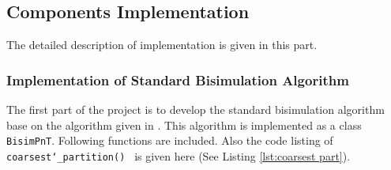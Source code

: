\subsection{Components Implementation}
\label{sec:comp_imp}
The detailed description of implementation is given in this part.

\subsubsection{Implementation of Standard Bisimulation Algorithm}
The first part of the project is to develop the standard bisimulation algorithm base on the algorithm given in \cite{Paige1987}.
This algorithm is implemented as a class \texttt{BisimPnT}.
Following functions are included.
Also the code listing of \texttt{coarsest\char`_partition() } is given here (See Listing \ref{lst:coarsest part}).\vspace{0.5em}


